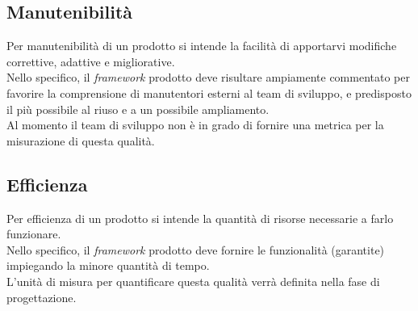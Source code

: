 	\subsection{Manutenibilità}
		Per manutenibilità di un prodotto si intende la facilità di apportarvi modifiche correttive, adattive e migliorative.\\
		Nello specifico, il \textit{framework} prodotto deve risultare ampiamente commentato per favorire la comprensione di manutentori esterni al team di sviluppo, e predisposto il più possibile al riuso e a un possibile ampliamento.\\
		Al momento il team di sviluppo non è in grado di fornire una metrica per la misurazione di questa qualità.\\
	\subsection{Efficienza}
		Per efficienza di un prodotto si intende la quantità di risorse necessarie a farlo funzionare.\\
		Nello specifico, il \textit{framework} prodotto deve fornire le funzionalità (garantite) impiegando la minore quantità di tempo.\\
		L'unità di misura per quantificare questa qualità verrà definita nella fase di progettazione.
